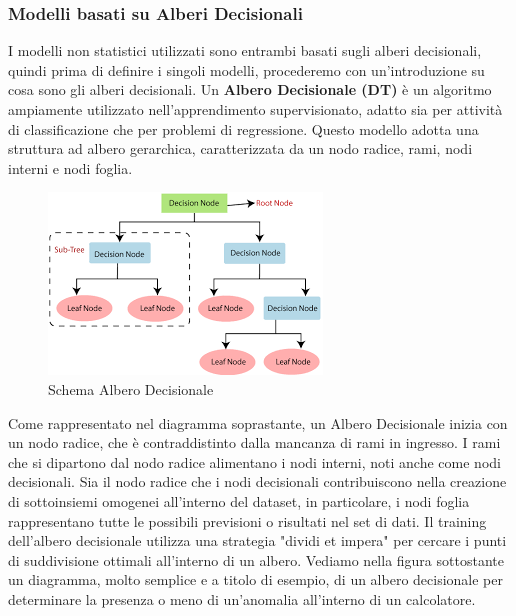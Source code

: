 \subsubsection{{Modelli basati su Alberi Decisionali}}
I modelli non statistici utilizzati sono entrambi basati sugli alberi decisionali, quindi prima di definire i singoli modelli, procederemo con un'introduzione su cosa sono gli alberi decisionali. Un \textbf{Albero Decisionale (DT)} \`e un algoritmo ampiamente utilizzato nell'apprendimento supervisionato, adatto sia per attivit\`a di classificazione che per problemi di regressione. Questo modello adotta una struttura ad albero gerarchica, caratterizzata da un nodo radice, rami, nodi interni e nodi foglia\cite{dt}.
\begin{figure}[H]
    \centering
    \includegraphics[width=0.6\linewidth]{DT.png}
    \caption{Schema Albero Decisionale}
    \label{fig:enter-label}
\end{figure}

\vspace{1cm}

Come rappresentato nel diagramma soprastante, un Albero Decisionale inizia con un nodo radice, che \`e contraddistinto dalla mancanza di rami in ingresso. I rami che si dipartono dal nodo radice alimentano i nodi interni, noti anche come nodi decisionali.  Sia il nodo radice che i nodi decisionali contribuiscono nella creazione di sottoinsiemi omogenei all'interno del dataset, in particolare, i nodi foglia rappresentano tutte le possibili previsioni o risultati nel set di dati. 
Il training dell'albero decisionale utilizza una strategia "dividi et impera" per cercare i punti di suddivisione ottimali all'interno di un albero.
Vediamo nella figura sottostante un diagramma, molto semplice e a titolo di esempio, di un albero decisionale per determinare la presenza o meno di un'anomalia all'interno di un calcolatore. 

